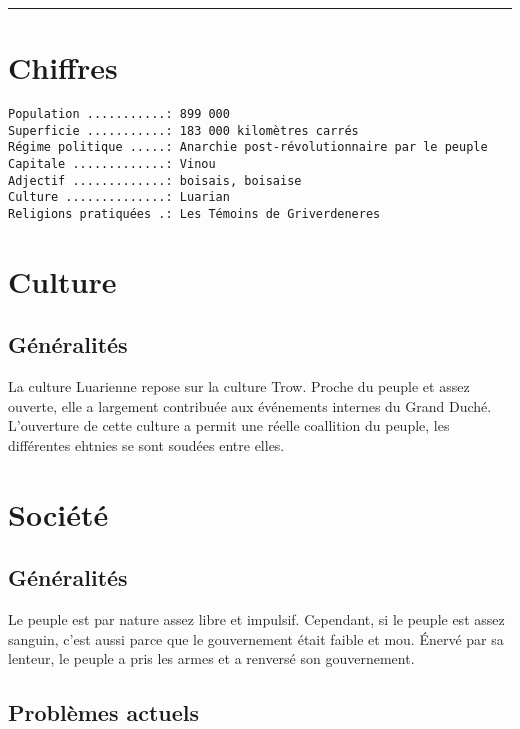 \documentclass[french, a4paper, 12pt]{article}
\begin{document}
 \maketitle \vspace{3pt} \hrule \vspace{3pt}

\section{Chiffres}

\begin{verbatim}
Population ...........: 899 000
Superficie ...........: 183 000 kilomètres carrés
Régime politique .....: Anarchie post-révolutionnaire par le peuple
Capitale .............: Vinou
Adjectif .............: boisais, boisaise
Culture ..............: Luarian
Religions pratiquées .: Les Témoins de Griverdeneres
\end{verbatim}

\section{Culture}

\subsection{Généralités}

La culture Luarienne repose sur la culture Trow. Proche du peuple et assez ouverte, elle a largement contribuée aux événements internes du Grand Duché. L'ouverture de cette culture a permit une réelle coallition du peuple, les différentes ehtnies se sont soudées entre elles.

\section{Société}

\subsection{Généralités}

Le peuple est par nature assez libre et impulsif. Cependant, si le peuple est assez sanguin, c'est aussi parce que le gouvernement était faible et mou. Énervé par sa lenteur, le peuple a pris les armes et a renversé son gouvernement.

\subsection{Problèmes actuels}
\end{document}
